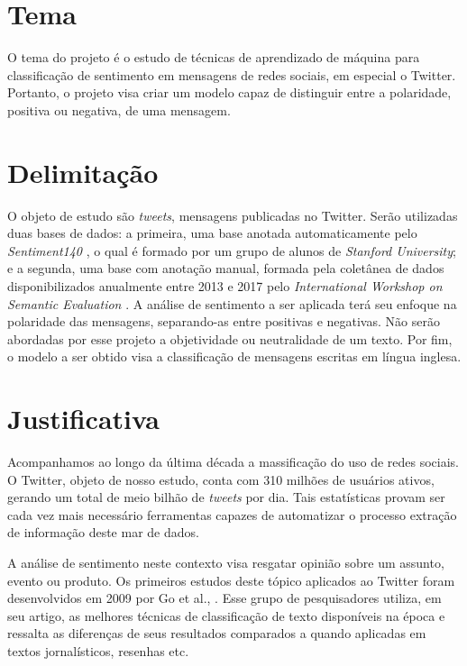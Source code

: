 \section{Tema}

O tema do projeto é o estudo de técnicas de aprendizado de máquina para classificação de sentimento em mensagens de redes sociais, em especial o Twitter. Portanto, o projeto visa criar um modelo capaz de distinguir entre a polaridade, positiva ou negativa, de uma mensagem.

\section{Delimitação}

O objeto de estudo são \textit{tweets}, mensagens publicadas no Twitter. Serão utilizadas duas bases de dados: a primeira, uma base anotada automaticamente pelo \textit{Sentiment140} \cite{sent140}, o qual é formado por um grupo de alunos de \textit{Stanford University}; e a segunda, uma base com anotação manual, formada pela coletânea de dados disponibilizados anualmente entre 2013 e 2017 pelo \textit{International Workshop on Semantic Evaluation} \cite{semeval17}. A análise de sentimento a ser aplicada terá seu enfoque na polaridade das mensagens, separando-as entre positivas e negativas. Não serão abordadas por esse projeto a objetividade ou neutralidade de um texto. Por fim, o modelo a ser obtido visa a classificação de mensagens escritas em língua inglesa.

\section{Justificativa}

Acompanhamos ao longo da última década a massificação do uso de redes sociais. O Twitter, objeto de nosso estudo, conta com 310 milhões de usuários ativos, gerando um total de meio bilhão de \textit{tweets} por dia. Tais estatísticas provam ser cada vez mais necessário ferramentas capazes de automatizar o processo extração de informação deste mar de dados.

A análise de sentimento neste contexto visa resgatar opinião sobre um assunto, evento ou produto. Os primeiros estudos deste tópico aplicados ao Twitter foram desenvolvidos em 2009 por Go et al., \cite{go09}. Esse grupo de pesquisadores utiliza, em seu artigo, as melhores técnicas de classificação de texto disponíveis na época e ressalta as diferenças de seus resultados comparados a quando aplicadas em textos jornalísticos, resenhas etc.

